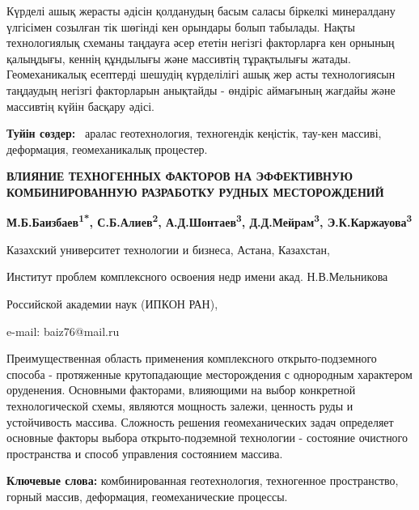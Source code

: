 Күрделі ашық жерасты әдісін қолданудың басым саласы біркелкі минералдану
үлгісімен созылған тік шөгінді кен орындары болып табылады. Нақты
технологиялық схеманы таңдауға әсер ететін негізгі факторларға кен
орнының қалыңдығы, кеннің құндылығы және массивтің тұрақтылығы жатады.
Геомеханикалық есептерді шешудің күрделілігі ашық жер асты технологиясын
таңдаудың негізгі факторларын анықтайды - өндіріс аймағының жағдайы және
массивтің күйін басқару әдісі.

{\bfseries Туйін сөздер:} \emph{~}аралас геотехнология, техногендік
кеңістік, тау-кен массиві, деформация, геомеханикалық процестер.

\begin{center}
{\large\bfseries ВЛИЯНИЕ ТЕХНОГЕННЫХ ФАКТОРОВ НА ЭФФЕКТИВНУЮ КОМБИНИРОВАННУЮ РАЗРАБОТКУ РУДНЫХ МЕСТОРОЖДЕНИЙ}

{\bfseries М.Б.Баизбаев\textsuperscript{1*}, С.Б.Алиев\textsuperscript{2},
А.Д.Шонтаев\textsuperscript{3}, Д.Д.Мейрам\textsuperscript{3},
Э.К.Каржауова\textsuperscript{3}}

Казахский университет технологии и бизнеса, Астана, Казахстан,

Институт проблем комплексного освоения недр имени акад. Н.В.Мельникова

Российской академии наук (ИПКОН РАН),

e-mail: baiz76@mail.ru
\end{center}

Преимущественная область применения комплексного открыто-подземного
способа - протяженные крутопадающие месторождения с однородным
характером оруденения. Основными факторами, влияющими на выбор
конкретной технологической схемы, являются мощность залежи, ценность
руды и устойчивость массива. Сложность решения геомеханических задач
определяет основные факторы выбора открыто-подземной технологии -
состояние очистного пространства и способ управления состоянием массива.

{\bfseries Ключевые слова:} комбинированная геотехнология, техногенное
пространство, горный массив, деформация, геомеханические процессы.

